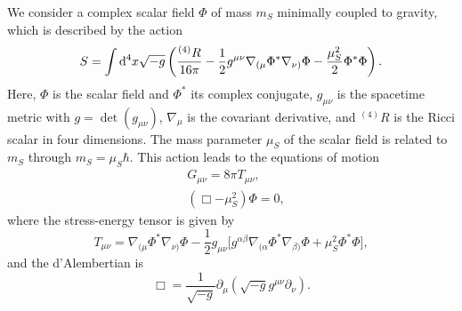 We consider a complex scalar field $\Phi$ of mass $m_S$ minimally coupled to gravity,
which is described by the action
\begin{equation}
    S = \int \mathrm{d}^4 x \sqrt{-g}
    \left(  \frac{^{(4)}R}{16\pi} - \frac{1}{2} g^{\mu\nu}
        \nabla_{(\mu} \Phi^*
        \nabla_{\nu)} \Phi
        - \frac{\mu_S^2}{2} \Phi^* \Phi
     \right).
\end{equation}
Here, $\Phi$ is the scalar field and $\Phi^*$ its complex conjugate,
$g_{\mu\nu}$ is the spacetime metric with $g=\det(g_{\mu\nu})$,
$\nabla_\mu$ is the covariant derivative,
and $^{(4)}R$ is the Ricci scalar in four dimensions.
The mass parameter $\mu_S$ of the scalar field is related to $m_S$ through $m_S = \mu_S\hbar$.
This action leads to the equations of motion
\begin{align}
    & G_{\mu\nu} = 8\pi T_{\mu\nu},
    \\
    & (\Box -\mu_S^2) \Phi = 0,
\end{align}
where the stress-energy tensor is given by
\begin{equation}
    T_{\mu\nu} =
    \nabla_{(\mu} \Phi^*
    \nabla_{\nu)} \Phi
    - \frac{1}{2} g_{\mu\nu} \Big[
    g^{\alpha\beta}
    \nabla_{(\alpha} \Phi^*
    \nabla_{\beta)} \Phi
+ \mu_S^2 \Phi^*\Phi \Big],
\end{equation}
and the d'Alembertian is
\begin{equation}
    \Box = 
    \frac{1}{\sqrt{-g}}
    \partial_\mu (
        \sqrt{-g} g^{\mu\nu} \partial_\nu
    ).
\end{equation}


